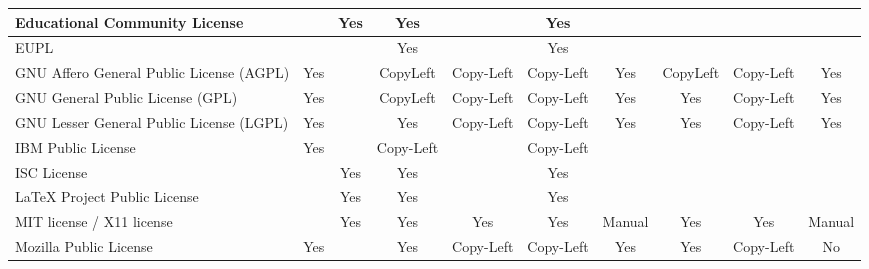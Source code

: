 \begin{frame}
{\begin{tabular}{lccccccccc}
      Educational Community License               &                         & Yes                    & Yes                       &           & Yes                  &        &          &                      &        \\ \hline
      EUPL                                        &                         &                        & Yes \footnotemark[7]      &           & Yes \footnotemark[8] &        &          &                      &        \\ \hline
      GNU Affero General  Public License (AGPL)   & Yes                     &                        & CopyLeft\footnotemark[9]  & Copy-Left & Copy-Left            & Yes    & CopyLeft & Copy-Left            & Yes    \\ \hline
      GNU General Public License (GPL)            & Yes                     &                        & CopyLeft\footnotemark[10] & Copy-Left & Copy-Left            & Yes    & Yes      & Copy-Left            & Yes    \\ \hline
      GNU Lesser General Public License (LGPL)    & Yes                     &                        & Yes \footnotemark[7]      & Copy-Left & Copy-Left            & Yes    & Yes      & Copy-Left            & Yes    \\ \hline
      IBM Public License                          & Yes                     &                        & Copy-Left                 &           & Copy-Left            &        &          &                      &        \\ \hline
      ISC License                                 &                         & Yes                    & Yes                       &           & Yes                  &        &          &                      &        \\ \hline
      LaTeX Project Public License                &                         & Yes                    & Yes                       &           & Yes                  &        &          &                      &        \\ \hline
      MIT license / X11 license                   &                         & Yes                    & Yes                       & Yes       & Yes                  & Manual & Yes      & Yes                  & Manual \\ \hline
      Mozilla Public License                      & Yes                     &                        & Yes                       & Copy-Left & Copy-Left            & Yes    & Yes      & Copy-Left            & No     \\ \hline

\end{tabular}}
\end{frame}

